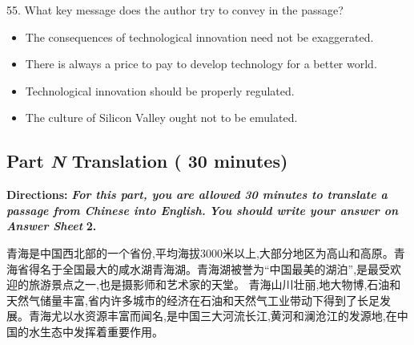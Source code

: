 \documentclass[UTF8,11pt]{ctexart}
\begin{document}
55. What key message does the author try to convey in the passage?


\begin{itemize}[leftmargin=2em,itemsep=.2em,topsep=.4em]\item[A.] The consequences of technological innovation need not be exaggerated.
\item[B.] There is always a price to pay to develop technology for a better world.
\item[C.] Technological innovation should be properly regulated.
\item[D.] The culture of Silicon Valley ought not to be emulated.
\end{itemize}

\subsection*{\textbf{Part }\textbf{\textit{N}} \textbf{Translation} \textbf{( 30 minutes)}}


\textbf{Directions: }\textbf{\textit{For this part, you are allowed 30 minutes to translate a passage from Chinese into English.}} \textbf{\textit{You should write your answer on Answer Sheet }}\textbf{2.}


青海是中国西北部的一个省份,平均海拔3000米以上,大部分地区为高山和高原。青海省得名于全国最大的咸水湖青海湖。青海湖被誉为“中国最美的湖泊”,是最受欢迎的旅游景点之一,也是摄影师和艺术家的天堂。 青海山川壮丽,地大物博,石油和天然气储量丰富,省内许多城市的经济在石油和天然气工业带动下得到了长足发展。青海尤以水资源丰富而闻名,是中国三大河流长江,黄河和澜沧江的发源地,在中国的水生态中发挥着重要作用。
\end{document}
